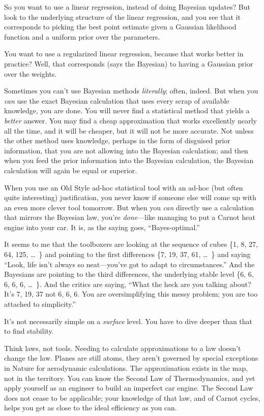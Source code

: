 {
 So you want to use a linear regression, instead of doing Bayesian
updates? But look to the underlying structure of the linear regression,
and you see that it corresponds to picking the best point estimate
given a Gaussian likelihood function and a uniform prior over the
parameters.}

{
 You want to use a regularized linear regression, because that
works better in practice? Well, that corresponds (says the Bayesian) to
having a Gaussian prior over the weights.}

{
 Sometimes you can't use Bayesian methods
\textit{literally}; often, indeed. But when you \textit{can} use the
exact Bayesian calculation that uses every scrap of available
knowledge, you are done. You will never find a statistical method that
yields a \textit{better} answer. You may find a cheap approximation
that works excellently nearly all the time, and it will be cheaper, but
it will not be more accurate. Not unless the other method uses
knowledge, perhaps in the form of disguised prior information, that you
are not allowing into the Bayesian calculation; and then when you feed
the prior information into the Bayesian calculation, the Bayesian
calculation will again be equal or superior.}

{
 When you use an Old Style ad-hoc statistical tool with an ad-hoc
(but often quite interesting) justification, you never know if someone
else will come up with an even more clever tool tomorrow. But when you
\textit{can} directly use a calculation that mirrors the Bayesian law,
you're \textit{done}{}---like managing to put a Carnot
heat engine into your car. It is, as the saying goes,
``Bayes-optimal.''}

{
 It seems to me that the toolboxers are looking at the sequence of
cubes \{1, 8, 27, 64, 125,
\ldots~\} and pointing to the first
differences \{7, 19, 37, 61,
\ldots~\} and saying
``Look, life isn't always so
neat---you've got to adapt to
circumstances.'' And the Bayesians are pointing to
the third differences, the underlying stable level
\{6, 6, 6, 6, 6,
\ldots~\}. And the critics are saying,
``What the heck are you talking about?
It's 7, 19, 37 not 6, 6, 6. You are oversimplifying
this messy problem; you are too attached to
simplicity.''}

{
 It's not necessarily simple on a \textit{surface}
level. You have to dive deeper than that to find stability.}

{
 Think laws, not tools. Needing to calculate approximations to a
law doesn't change the law. Planes are still atoms,
they aren't governed by special exceptions in Nature
for aerodynamic calculations. The approximation exists in the map, not
in the territory. You can know the Second Law of Thermodynamics, and
yet apply yourself as an engineer to build an imperfect car engine. The
Second Law does not cease to be applicable; your knowledge of that law,
and of Carnot cycles, helps you get as close to the ideal efficiency as
you can.}

